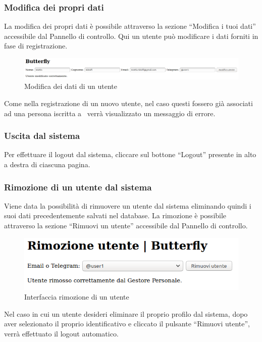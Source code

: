 \subsubsection{Modifica dei propri dati}
La modifica dei propri dati è possibile attraverso la sezione ``Modifica i tuoi dati'' accessibile dal Pannello di controllo.
Qui un utente può modificare i dati forniti in fase di registrazione.
\begin{figure}[H]
	\centering
	\includegraphics[width=\textwidth]{img/modifica_1.png}
	\caption{Modifica dei dati di un utente}
\end{figure}
Come nella registrazione di un nuovo utente, nel caso questi fossero già associati ad una persona iscritta a \progetto\ verrà visualizzato un messaggio di errore.

\subsubsection{Uscita dal sistema}
Per effettuare il logout dal sistema, cliccare sul bottone ``Logout'' presente in alto a destra di ciascuna pagina.

\subsubsection{Rimozione di un utente dal sistema}
Viene data la possibilità di rimuovere un utente dal sistema eliminando quindi i suoi dati precedentemente salvati nel database.
La rimozione è possibile attraverso la sezione ``Rimuovi un utente'' accessibile dal Pannello di controllo.
\begin{figure}[H]
	\centering
	\includegraphics[width=12cm]{img/rimozione_1.png}
	\caption{Interfaccia rimozione di un utente}
\end{figure}
Nel caso in cui un utente desideri eliminare il proprio profilo dal sistema, dopo aver selezionato il proprio identificativo e cliccato il pulsante ``Rimuovi utente'', verrà effettuato il logout automatico.

